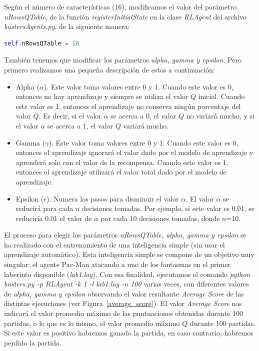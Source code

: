 \documentclass[11pt]{exam}
\begin{document}
Según el número de características (16), modificamos el valor del parámetro \textit{nRowsQTable}, de la función \textit{registerInitialState} en la clase \textit{RLAgent} del archivo \textit{bustersAgents.py}, de la siguiente manera:

\begin{lstlisting}[language=python, basicstyle=\footnotesize]
self.nRowsQTable = 16
\end{lstlisting}

También tenemos que modificar los parámetros \textit{alpha, gamma y epsilon}. Pero primero realizamos una pequeña descripción de estos a continuación:

\begin{itemize}
	\item Alpha ($\alpha$). Este valor toma valores entre 0 y 1. Cuando este valor es 0, entonces no hay aprendizaje y siempre se utiliza el valor $Q$ inicial. Cuando este valor es 1, entonces el aprendizaje no conserva ningún porcentaje del valor $Q$. Es decir, si el valor $\alpha$ se acerca a 0, el valor $Q$ no variará mucho, y si el valor $\alpha$ se acerca a 1, el valor $Q$ variará mucho.
	
	\item Gamma ($\gamma$). Este valor toma valores entre 0 y 1. Cuando este valor es 0, entonces el aprendizaje ignorará el valor dado por el modelo de aprendizaje y aprenderá solo con el valor de la recompensa. Cuando este valor es 1, entonces el aprendizaje utilizará el valor total dado por el modelo de aprendizaje.
	
	\item Epsilon ($\epsilon$). Numera los pasos para disminuir el valor $\alpha$. El valor $\alpha$ se reducirá para cada $n$ decisiones tomadas. Por ejemplo, si este valor es 0.01, se reduciría 0.01 el valor de $\alpha$ por cada 10 decisiones tomadas, donde $n$=10.
\end{itemize}

El proceso para elegir los parámetros \textit{nRowsQTable, alpha, gamma y epsilon} se ha realizado con el entrenamiento de una inteligencia simple (sin usar el aprendizaje automático). Esta inteligencia simple se compone de un objetivo muy singular: el agente Pac-Man atacando a uno de los fantasmas en el primer laberinto disponible (\textit{lab1.lay}). Con esa finalidad, ejecutamos el comando \textit{python busters.py -p RLAgent -k 1 -l lab1.lay -n 100} varias veces, con diferentes valores de \textit{alpha, gamma y epsilon} observando el valor resultante \textit{Average Score} de las distintas ejecuciones (ver Figura~\ref{average_score}). El valor \textit{Average Score} nos indicará el valor promedio máximo de las puntuaciones obtenidas durante 100 partidas, o lo que es lo mismo, el valor promedio máximo $Q$ durante 100 partidas. Si este valor es positivo habremos ganado la partida, en caso contrario, habremos perdido la partida.
\vspace*{2mm}
\end{document}
